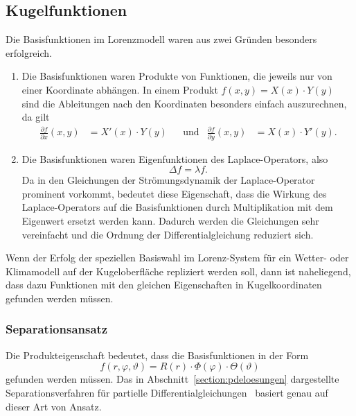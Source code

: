 %
%
%
\subsection{Kugelfunktionen}
Die Basisfunktionen im Lorenzmodell waren aus zwei Gründen besonders
erfolgreich.
\begin{enumerate}
\item
Die Basisfunktionen waren Produkte von Funktionen, die jeweils nur von
einer Koordinate abhängen.
In einem Produkt 
$f(x,y)=X(x)\cdot Y(y)$ 
sind die Ableitungen nach den Koordinaten besonders einfach auszurechnen,
da gilt
\[
\begin{aligned}
\frac{\partial f}{\partial x}(x,y) &= X'(x)\cdot Y(y)
&&\text{und}&
\frac{\partial f}{\partial y}(x,y) &= X(x)\cdot Y'(y).
\end{aligned}
\]
\item
Die Basisfunktionen waren Eigenfunktionen des Laplace-Operators, also
\[
\Delta f = \lambda f.
\]
Da in den Gleichungen der Strömungsdynamik der Laplace-Operator
prominent vorkommt, bedeutet diese Eigenschaft, dass die Wirkung des
Laplace-Operators auf die Basisfunktionen durch Multiplikation mit
dem Eigenwert ersetzt werden kann.
Dadurch werden die Gleichungen sehr vereinfacht und die Ordnung
der Differentialgleichung reduziert sich.
\end{enumerate}
Wenn der Erfolg der speziellen Basiswahl im Lorenz-System für ein
Wetter- oder Klimamodell auf der Kugeloberfläche repliziert werden
soll, dann ist naheliegend, dass dazu Funktionen mit den gleichen
Eigenschaften in Kugelkoordinaten gefunden werden müssen.

\subsubsection{Separationsansatz}
Die Produkteigenschaft bedeutet, dass die Basisfunktionen in der Form
\[
f(r,\varphi,\vartheta)
=
R(r)\cdot \Phi(\varphi)\cdot \Theta(\vartheta)
\]
gefunden werden müssen.
Das in Abschnitt~\ref{section:pdeloesungen} dargestellte
Separationsverfahren für partielle
Differentialgleichungen~\cite[Chapter 4]{skript:pde}
basiert genau auf dieser Art von Ansatz.

